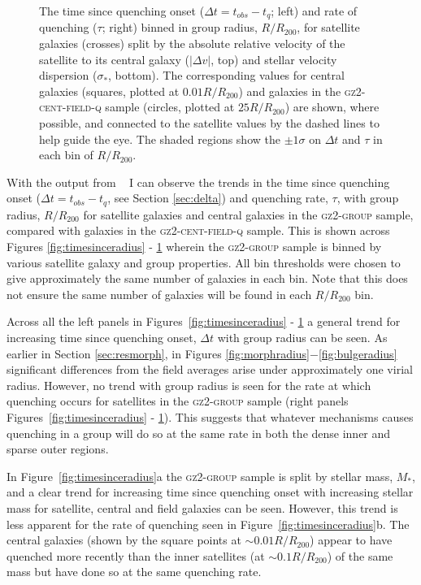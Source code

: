\begin{figure}
{\caption[Trend of $\Delta t$ and $\tau$ with group radius split by relative velocity and stellar velocity dispersion]{The time since quenching onset ($\Delta t = t_{obs} - t_{q}$; left) and rate of quenching ($\tau$; right) binned in group radius, $R/R_{200}$, for satellite galaxies (crosses) split by the absolute relative velocity of the satellite to its central galaxy ($|\Delta v|$, top) and stellar velocity dispersion ($\sigma_*$, bottom). The corresponding values for central galaxies (squares, plotted at $0.01 R/R_{200}$) and galaxies in the \textsc{gz2-cent-field-q} sample (circles, plotted at $25 R/R_{200}$) are shown, where possible, and connected to the satellite values by the dashed lines to help guide the eye. The shaded regions show the $\pm1\sigma$ on $\Delta t$ and $\tau$ in each bin of $R/R_{200}$.}
\label{fig:timesinceradiusvel}}
\end{figure}

With the output from \starpy~ I can observe the trends in the time since quenching onset ($\Delta t = t_{obs} - t_{q}$, see Section \ref{sec:delta}) and quenching rate, $\tau$, with group radius, $R/R_{200}$ for satellite galaxies and central galaxies in the \textsc{gz2-group} sample, compared with galaxies in the \textsc{gz2-cent-field-q} sample. This is shown across Figures \ref{fig:timesinceradius} - \ref{fig:timesinceradiusvel} wherein the \textsc{gz2-group} sample is binned by various satellite galaxy and group properties. All bin thresholds were chosen to give approximately the same number of galaxies in each bin. Note that this does not ensure the same number of galaxies will be found in each $R/R_{200}$ bin. 

Across all the left panels in Figures~\ref{fig:timesinceradius} - \ref{fig:timesinceradiusvel} a general trend for increasing time since quenching onset, $\Delta t$ with group radius can be seen. As earlier in Section \ref{sec:resmorph}, in Figures \ref{fig:morphradius}$-$\ref{fig:bulgeradius} significant differences from the field averages arise under approximately one virial radius. However, no trend with group radius is seen for the rate at which quenching occurs for satellites in the \textsc{gz2-group} sample (right panels Figures~\ref{fig:timesinceradius} - \ref{fig:timesinceradiusvel}). This suggests that whatever mechanisms causes quenching in a group will do so at the same rate in both the dense inner and sparse outer regions. 

In Figure~\ref{fig:timesinceradius}a the \textsc{gz2-group} sample is split by stellar mass, $M_*$, and a clear trend for increasing time since quenching onset with increasing stellar mass for satellite, central and field galaxies can be seen. However, this trend is less apparent for the rate of quenching seen in Figure~\ref{fig:timesinceradius}b. The central galaxies (shown by the square points at $\sim 0.01 R/R_{200}$) appear to have quenched more recently than the inner satellites (at $\sim0.1R/R_{200}$) of the same mass but have done so at the same quenching rate. 

